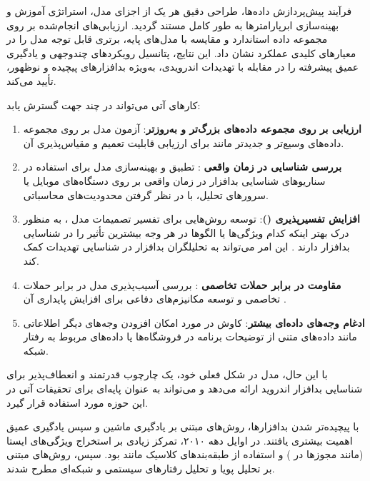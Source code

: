 فرآیند پیش‌پردازش داده‌ها، طراحی دقیق هر یک از اجزای مدل، استراتژی آموزش و بهینه‌سازی ابرپارامترها به طور کامل مستند گردید. ارزیابی‌های انجام‌شده بر روی مجموعه داده استاندارد  و مقایسه با مدل‌های پایه، برتری قابل توجه مدل  را در معیارهای کلیدی عملکرد نشان داد. این نتایج، پتانسیل رویکردهای چندوجهی و یادگیری عمیق پیشرفته را در مقابله با تهدیدات اندرویدی، به‌ویژه بدافزارهای پیچیده و نوظهور، تأیید می‌کند.

کارهای آتی می‌تواند در چند جهت گسترش یابد:
\begin{enumerate}
    \item \textbf{ارزیابی بر روی مجموعه داده‌های بزرگ‌تر و به‌روزتر}: آزمون مدل  بر روی مجموعه داده‌های وسیع‌تر و جدیدتر مانند  \cite{CICMalDroid} برای ارزیابی قابلیت تعمیم و مقیاس‌پذیری آن.
    \item \textbf{بررسی شناسایی در زمان واقعی }: تطبیق و بهینه‌سازی مدل برای استفاده در سناریوهای شناسایی بدافزار در زمان واقعی بر روی دستگاه‌های موبایل یا سرورهای تحلیل، با در نظر گرفتن محدودیت‌های محاسباتی.
    \item \textbf{افزایش تفسیرپذیری ()}: توسعه روش‌هایی برای تفسیر تصمیمات مدل ، به منظور درک بهتر اینکه کدام ویژگی‌ها یا الگوها در هر وجه بیشترین تأثیر را در شناسایی بدافزار دارند \cite{Marastoni2022}. این امر می‌تواند به تحلیلگران بدافزار در شناسایی تهدیدات کمک کند.
    \item \textbf{مقاومت در برابر حملات تخاصمی }: بررسی آسیب‌پذیری مدل در برابر حملات تخاصمی و توسعه مکانیزم‌های دفاعی برای افزایش پایداری آن \cite{Demontis2017}.
    \item \textbf{ادغام وجه‌های داده‌ای بیشتر}: کاوش در مورد امکان افزودن وجه‌های دیگر اطلاعاتی مانند داده‌های متنی از توضیحات برنامه در فروشگاه‌ها یا داده‌های مربوط به رفتار شبکه.
\end{enumerate}

با این حال، مدل  در شکل فعلی خود، یک چارچوب قدرتمند و انعطاف‌پذیر برای شناسایی بدافزار اندروید ارائه می‌دهد و می‌تواند به عنوان پایه‌ای برای تحقیقات آتی در این حوزه مورد استفاده قرار گیرد.

با پیچیده‌تر شدن بدافزارها، روش‌های مبتنی بر یادگیری ماشین و سپس یادگیری عمیق اهمیت بیشتری یافتند. در اوایل دهه ۲۰۱۰، تمرکز زیادی بر استخراج ویژگی‌های ایستا (مانند مجوزها در  \cite{Drebin}) و استفاده از طبقه‌بندهای کلاسیک مانند  بود. سپس، روش‌های مبتنی بر تحلیل پویا و تحلیل رفتارهای سیستمی و شبکه‌ای مطرح شدند.

